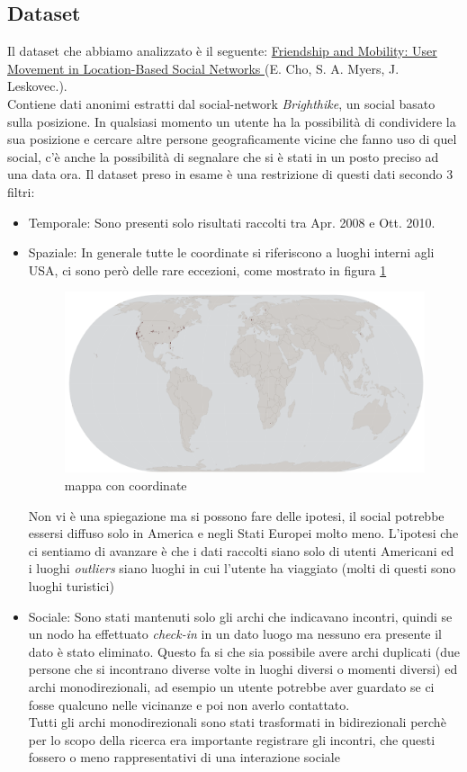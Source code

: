 \documentclass[a4paper]{article}
\begin{document}
\subsection{Dataset}
Il dataset che abbiamo analizzato è il seguente: \href{http://snap.stanford.edu/data/loc-brightkite.html}{ Friendship and Mobility: User Movement in Location-Based Social Networks }(E. Cho, S. A. Myers, J. Leskovec.).\\
Contiene dati anonimi estratti dal social-network \textit{Brighthike}, un social basato sulla posizione.
In qualsiasi momento un utente ha la possibilità di condividere la sua posizione e cercare altre persone geograficamente vicine che fanno uso di quel social, c'è anche la possibilità di segnalare che si è stati in un posto preciso ad una data ora.
Il dataset preso in esame è una restrizione di questi dati secondo 3 filtri:
\begin{itemize}
	\item Temporale: Sono presenti solo risultati raccolti tra Apr. 2008 e Ott. 2010.
	\item Spaziale: In generale tutte le coordinate si riferiscono a luoghi interni agli USA, ci sono però delle rare eccezioni, come mostrato in figura \ref{FIG:posizione_generica}
		\begin{figure}[!ht]
			\centering
			\includegraphics[width=\linewidth]{posizione_generica}
			\caption{mappa con coordinate}
			\label{FIG:posizione_generica}
		\end{figure}
		Non vi è una spiegazione ma si possono fare delle ipotesi, il social potrebbe essersi diffuso solo in America e negli Stati Europei molto meno.
		L'ipotesi che ci sentiamo di avanzare è che i dati raccolti siano solo di utenti Americani ed i luoghi \textit{outliers} siano luoghi in cui l'utente ha viaggiato (molti di questi sono luoghi turistici)
	\item Sociale: Sono stati mantenuti solo gli archi che indicavano incontri, quindi se un nodo ha effettuato \textit{check-in} in un dato luogo ma nessuno era presente il dato è stato eliminato.
		Questo fa si che sia possibile avere archi duplicati (due persone che si incontrano diverse volte in luoghi diversi o momenti diversi) ed archi monodirezionali, ad esempio un utente potrebbe aver guardato se ci fosse qualcuno nelle vicinanze e poi non averlo contattato.\\
		Tutti gli archi monodirezionali sono stati trasformati in bidirezionali perchè per lo scopo della ricerca era importante registrare gli incontri, che questi fossero o meno rappresentativi di una interazione sociale
\end{itemize}
\end{document}

